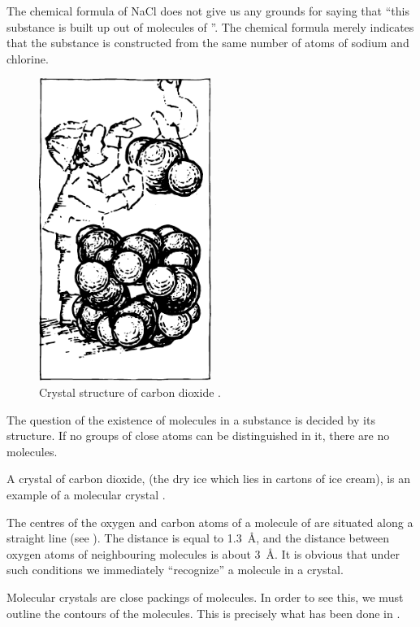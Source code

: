 The chemical formula of NaCl does not give us any
grounds for saying that ``this substance is built up out of molecules of ''. The chemical formula merely indicates that the substance is constructed from the same number of atoms of sodium and chlorine.

\begin{figure}[!ht]
\centering
\includegraphics[width=0.5\textwidth]{figures/fig-02-20.pdf}
\caption{Crystal structure of carbon dioxide .}
\label{fig-2.20}
\end{figure}

The question of the existence of molecules in a substance is decided by its structure. If no groups of close atoms can be distinguished in it, there are no molecules.


A crystal of carbon dioxide,  (the dry ice which lies in cartons of ice cream), is an example of a molecular crystal .

The centres of the oxygen and carbon atoms of a molecule of  are situated along a straight line (see ­). The distance  is equal to \SI{1.3}{\angstrom}, and the distance between oxygen atoms of neighbouring molecules is about \SI{3}{\angstrom}. It is obvious that under such conditions we immediately ``recognize'' a molecule in a crystal.

Molecular crystals are close packings of molecules. In order to see this, we must outline the contours of the molecules. This is precisely what has been done in .


